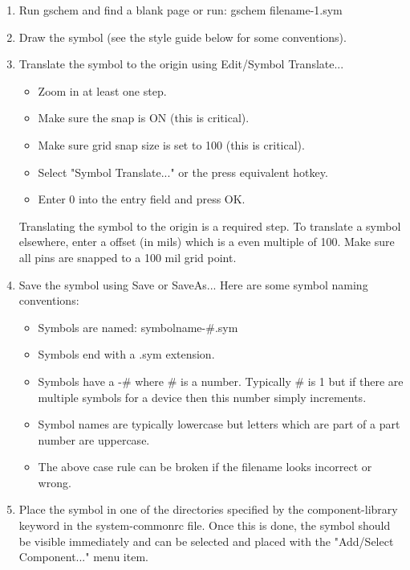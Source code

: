 \documentclass{article}
\begin{document}
\begin{enumerate}
\item Run gschem and find a blank page or run:  gschem filename-1.sym
\item Draw the symbol (see the style guide below for some conventions).
\item Translate the symbol to the origin using Edit/Symbol Translate...
\begin{itemize}
	\item Zoom in at least one step.
	\item Make sure the snap is ON (this is critical).
	\item Make sure grid snap size is set to 100 (this is critical).
	\item Select "Symbol Translate..." or the press equivalent hotkey.
	\item Enter 0 into the entry field and press OK.
\end{itemize}
Translating the symbol to the origin is a required step.  To translate
a symbol elsewhere, enter a offset (in mils) which is a even multiple
of 100.  Make sure all pins are snapped to a 100 mil grid point.
\item Save the symbol using Save or SaveAs...  Here are some symbol naming 
conventions:
\begin{itemize}
	\item Symbols are named: symbolname-\#.sym
	\item Symbols end with a .sym extension.
	\item Symbols have a -\# where \# is a number.  Typically \# is
              1 but if there are multiple symbols for a device then
              this number simply increments.
	\item Symbol names are typically lowercase but letters which
              are part of a part number are uppercase.
	\item The above case rule can be broken if the filename
              looks incorrect or wrong.
\end{itemize}
\item Place the symbol in one of the directories specified by the
      component-library keyword in the system-commonrc file.  Once this is
      done, the symbol should be visible immediately and can be selected
      and placed with the "Add/Select Component..." menu item.

\end{enumerate}

\newpage
\end{document}
